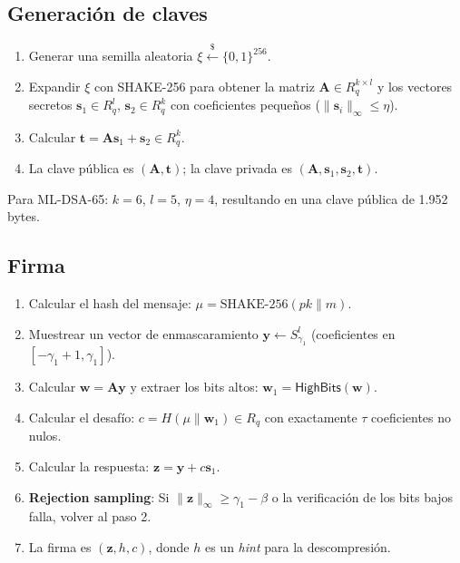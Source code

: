 \subsection{Generación de claves}

\begin{enumerate}
  \item Generar una semilla aleatoria $\xi \xleftarrow{\$} \{0,1\}^{256}$.
  \item Expandir $\xi$ con SHAKE-256 para obtener la matriz $\mathbf{A} \in R_q^{k \times l}$ y los vectores secretos $\mathbf{s}_1 \in R_q^l$, $\mathbf{s}_2 \in R_q^k$ con coeficientes pequeños ($\|\mathbf{s}_i\|_\infty \leq \eta$).
  \item Calcular $\mathbf{t} = \mathbf{A}\mathbf{s}_1 + \mathbf{s}_2 \in R_q^k$.
  \item La clave pública es $(\mathbf{A}, \mathbf{t})$; la clave privada es $(\mathbf{A}, \mathbf{s}_1, \mathbf{s}_2, \mathbf{t})$.
\end{enumerate}

Para ML-DSA-65: $k = 6$, $l = 5$, $\eta = 4$, resultando en una clave pública de 1.952 bytes.

\subsection{Firma}

\begin{enumerate}
  \item Calcular el hash del mensaje: $\mu = \text{SHAKE-256}(\mathit{pk} \| m)$.
  \item Muestrear un vector de enmascaramiento $\mathbf{y} \leftarrow S_{\gamma_1}^l$ (coeficientes en $[-\gamma_1 + 1, \gamma_1]$).
  \item Calcular $\mathbf{w} = \mathbf{A}\mathbf{y}$ y extraer los bits altos: $\mathbf{w}_1 = \textsf{HighBits}(\mathbf{w})$.
  \item Calcular el desafío: $c = H(\mu \| \mathbf{w}_1) \in R_q$ con exactamente $\tau$ coeficientes no nulos.
  \item Calcular la respuesta: $\mathbf{z} = \mathbf{y} + c\mathbf{s}_1$.
  \item \textbf{Rejection sampling}: Si $\|\mathbf{z}\|_\infty \geq \gamma_1 - \beta$ o la verificación de los bits bajos falla, volver al paso 2.
  \item La firma es $(\mathbf{z}, h, c)$, donde $h$ es un \emph{hint} para la descompresión.
\end{enumerate}

